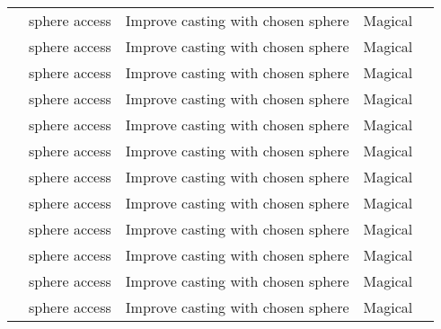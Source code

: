 \begin{longtabuwrapper}
\begin{longtabu}{>{\lcol}p{11em} >{\lcol}p{15em} >{\lcol}X >{\lcol}p{8em} >{\lcol}p{3em}}
         &  sphere access & Improve casting with chosen sphere           & Magical &  \\
              &  sphere access      & Improve casting with chosen sphere           & Magical &       \\
                   &  sphere access           & Improve casting with chosen sphere           & Magical &            \\
               &  sphere access       & Improve casting with chosen sphere           & Magical &        \\
                &  sphere access        & Improve casting with chosen sphere           & Magical &         \\
                 &  sphere access         & Improve casting with chosen sphere           & Magical &          \\
             &  sphere access     & Improve casting with chosen sphere           & Magical &      \\
              &  sphere access      & Improve casting with chosen sphere           & Magical &       \\
                   &  sphere access           & Improve casting with chosen sphere           & Magical &            \\
               &  sphere access       & Improve casting with chosen sphere           & Magical &        \\
                &  sphere access        & Improve casting with chosen sphere           & Magical &         \\
                &  sphere access        & Improve casting with chosen sphere           & Magical &         \\

\end{longtabu}
\end{longtabuwrapper}
